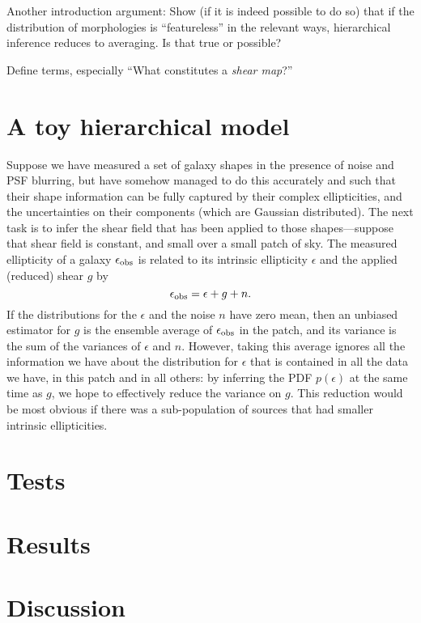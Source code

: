 \documentclass[12pt]{article}
\begin{document}
Another introduction argument: Show (if it is indeed possible to do
so) that if the distribution of morphologies is ``featureless'' in the
relevant ways, hierarchical inference reduces to averaging.  Is that
true or possible?

Define terms, especially ``What constitutes a \emph{shear map}?''

\section{A toy hierarchical model}

Suppose we have measured a set of galaxy shapes in the presence of noise and
PSF blurring, but have somehow managed to do this accurately and such that
their shape information can be fully captured by their complex ellipticities,
and the uncertainties on their components (which are Gaussian distributed).
The next task is to infer the shear field that has been applied to those
shapes---suppose that shear field is constant, and small over a small patch of
sky. The measured ellipticity of a galaxy $\epsilon_{\rm obs}$ 
is related to its intrinsic
ellipticity $\epsilon$ and the applied (reduced) shear $g$ by 
\begin{equation}
\epsilon_{\rm obs} = \epsilon + g + n.
\end{equation}
If the distributions for the $\epsilon$ and the noise $n$ have zero mean, then
an unbiased estimator for $g$ is the ensemble average of $\epsilon_{\rm obs}$
in the patch, and its variance is the sum of the variances of $\epsilon$ and
$n$. However, taking this average ignores all the information we have
about the distribution for $\epsilon$ that is contained in all the data we
have, in this patch and in all others: by inferring the PDF $p(\epsilon)$ at
the same time as $g$, we hope to effectively reduce the variance on $g$. This
reduction would be most obvious if there was a sub-population of sources that
had smaller intrinsic ellipticities. 

\section{Tests}

\section{Results}

\section{Discussion}
\end{document}
